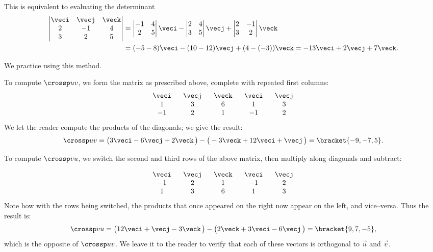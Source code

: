 This is equivalent to evaluating the determinant
\begin{align*}
 \begin{vmatrix}\veci&\vecj&\veck\\2&-1&4\\3&2&5\end{vmatrix}
 &=\begin{vmatrix}-1&4\\2&5\end{vmatrix}\veci
 -\begin{vmatrix}2&4\\3&5\end{vmatrix}\vecj
 +\begin{vmatrix}2&-1\\3&2\end{vmatrix}\veck \\
 &=(-5-8)\veci-(10-12)\vecj+(4-(-3))\veck
 =-13\veci+2\vecj+7\veck.
\end{align*}

We practice using this method.

{To compute $\crossp uv$, we form the matrix as prescribed above, complete with repeated first columns:
\[\begin{array}{ccccc} \ \veci\ &\ \vecj\ &\ \veck\ &\ \veci\ &\ \vecj\ \\  1&3&6&1&3\\-1&2&1&-1&2\end{array}\]
We let the reader compute the products of the diagonals; we give the result:
\[\crossp uv = \big(3\veci-6\vecj+2\veck\,\big) - \big(-3\veck + 12\veci+\vecj\,\big) = \bracket{-9,-7,5}.\]

To compute $\crossp vu$, we switch the second and third rows of the above matrix, then multiply along diagonals and subtract:

\[\begin{array}{ccccc} \ \veci\ &\ \vecj\ &\ \veck\ &\ \veci\ &\ \vecj\ \\-1&2&1&-1&2\\  1&3&6&1&3\end{array}\]
Note how with the rows being switched, the products that once appeared on the right now appear on the left, and vice--versa. Thus the result is:
\[\crossp vu = \big(12\veci+\vecj-3\veck\,\big) - \big(2\veck + 3\veci-6\vecj\,\big) = \bracket{9,7,-5},\]
which is the opposite of $\crossp uv$. We leave it to the reader to verify that each of these vectors is orthogonal to $\vec u$ and $\vec v$.}

